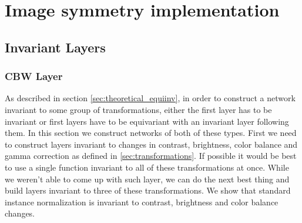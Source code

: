 \section{Image symmetry implementation}
\newcommand\cbw{\mathit{CBW}}
\newcommand\gbw{\mathit{GBW}}

\subsection{Invariant Layers}
\subsubsection{CBW Layer}
As described in section \ref{sec:theoretical_equiinv}, in order to construct a network
invariant to some group of transformations, either the first layer has to be
invariant or first layers have to be equivariant with an invariant layer
following them. In this section we construct networks of both of these types.
First we need to construct layers invariant to changes in
contrast, brightness, color balance and gamma correction as defined in
\ref{sec:transformations}. If possible it would be best to use a single function
invariant to all of these transformations at once. While we weren't able to come
up with such layer, we can do the next best thing and build layers invariant to
three of these transformations.
We show that standard instance normalization is invariant to contrast, brightness
and color balance changes.

